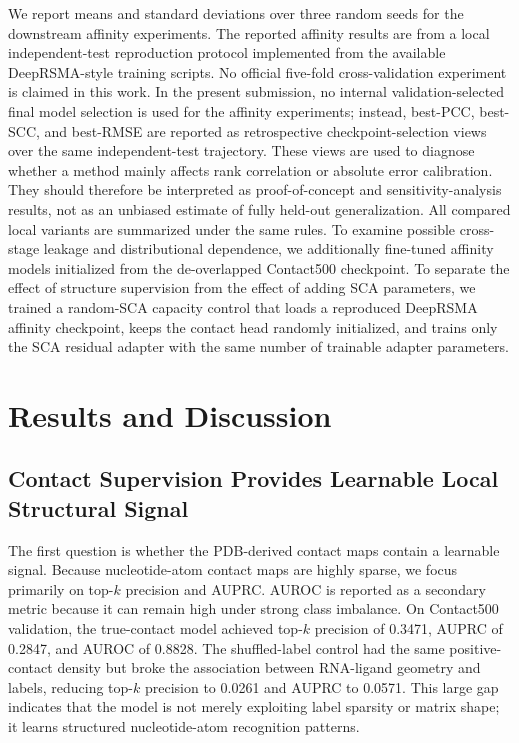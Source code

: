 ﻿\documentclass[journal=jcisd8,manuscript=article]{achemso}
\begin{document}
We report means and standard deviations over three random seeds for the downstream affinity experiments. The reported affinity results are from a local independent-test reproduction protocol implemented from the available DeepRSMA-style training scripts. No official five-fold cross-validation experiment is claimed in this work. In the present submission, no internal validation-selected final model selection is used for the affinity experiments; instead, best-PCC, best-SCC, and best-RMSE are reported as retrospective checkpoint-selection views over the same independent-test trajectory. These views are used to diagnose whether a method mainly affects rank correlation or absolute error calibration. They should therefore be interpreted as proof-of-concept and sensitivity-analysis results, not as an unbiased estimate of fully held-out generalization. All compared local variants are summarized under the same rules. To examine possible cross-stage leakage and distributional dependence, we additionally fine-tuned affinity models initialized from the de-overlapped Contact500 checkpoint. To separate the effect of structure supervision from the effect of adding SCA parameters, we trained a random-SCA capacity control that loads a reproduced DeepRSMA affinity checkpoint, keeps the contact head randomly initialized, and trains only the SCA residual adapter with the same number of trainable adapter parameters.

\section{Results and Discussion}

\subsection{Contact Supervision Provides Learnable Local Structural Signal}

The first question is whether the PDB-derived contact maps contain a learnable signal. Because nucleotide-atom contact maps are highly sparse, we focus primarily on top-$k$ precision and AUPRC. AUROC is reported as a secondary metric because it can remain high under strong class imbalance. On Contact500 validation, the true-contact model achieved top-$k$ precision of 0.3471, AUPRC of 0.2847, and AUROC of 0.8828. The shuffled-label control had the same positive-contact density but broke the association between RNA-ligand geometry and labels, reducing top-$k$ precision to 0.0261 and AUPRC to 0.0571. This large gap indicates that the model is not merely exploiting label sparsity or matrix shape; it learns structured nucleotide-atom recognition patterns.
\end{document}
